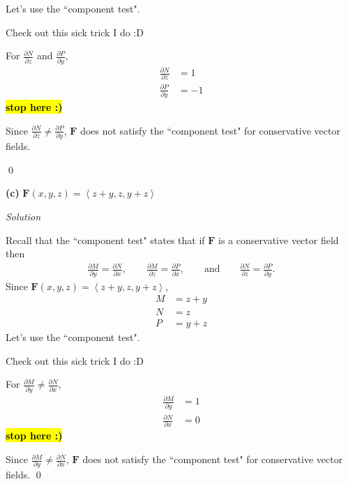 \documentclass{article}
\newcommand{\lra}[1]{\left\langle #1 \right\rangle}
\newcommand{\F}[0]{\mathbf{F}}
\newcommand{\Solution}{\textit{Solution}}
\begin{document}
Let's use the ``component test".

Check out this sick trick I do :D

{}
For $\displaystyle \frac{\partial N}{\partial z}$ and $\displaystyle\frac{\partial P}{\partial y}$,
\begin{align*}
     \frac{\partial N}{\partial z}&=1\\
     \frac{\partial P}{\partial y}&= -1
\end{align*}
\hl{\textbf{stop here :)}}

Since $\displaystyle \frac{\partial N}{\partial z}\neq\frac{\partial P}{\partial y}$, $\F$ does not satisfy the ``component test" for conservative vector fields.

\qed

{}\textbf{(c)} $\F(x,y,z)=\lra{z+y,z,y+z}$

\Solution

Recall that the ``component test" states that if $\F$ is a conservative vector field then
\begin{align*}
    \frac{\partial M}{\partial y}=\frac{\partial N}{\partial x},\hspace{2em}\frac{\partial M}{\partial z}=\frac{\partial P}{\partial x},\hspace{2em} \text{and}\hspace{2em}\frac{\partial N}{\partial z}=\frac{\partial P}{\partial y}.
\end{align*}
Since $\F(x,y,z)=\lra{z+y,z,y+z}$, \begin{align*}
    M&=z+y\\
    N&=z\\
    P&=y+z
\end{align*}
Let's use the ``component test".

Check out this sick trick I do :D

{}
For $\displaystyle \frac{\partial M}{\partial y}\neq\frac{\partial N}{\partial x}$,
\begin{align*}
    \frac{\partial M}{\partial y}&=1\\
    \frac{\partial N}{\partial x}&=0
\end{align*}
\hl{\textbf{stop here :)}}

Since $\displaystyle \frac{\partial M}{\partial y}\neq\frac{\partial N}{\partial x}$, $\F$ does not satisfy the ``component test" for conservative vector fields.
\qed
\end{document}
